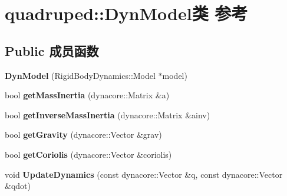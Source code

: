 \hypertarget{classquadruped_1_1DynModel}{}\section{quadruped\+:\+:Dyn\+Model类 参考}
\label{classquadruped_1_1DynModel}
\subsection*{Public 成员函数}
\begin{DoxyCompactItemize}
\item 
\mbox{\label{classquadruped_1_1DynModel_ab672659353b9fc396875c4bbfed6d74e}} 
{\bfseries Dyn\+Model} (Rigid\+Body\+Dynamics\+::\+Model $\ast$model)
\item 
\mbox{\label{classquadruped_1_1DynModel_abfc19642bbacc9832a609538b30470fc}} 
bool {\bfseries get\+Mass\+Inertia} (dynacore\+::\+Matrix \&a)
\item 
\mbox{\label{classquadruped_1_1DynModel_a104e7f42acd13041c6461f36255d6469}} 
bool {\bfseries get\+Inverse\+Mass\+Inertia} (dynacore\+::\+Matrix \&ainv)
\item 
\mbox{\label{classquadruped_1_1DynModel_a9936433050d9bf75c60e093aab1ae405}} 
bool {\bfseries get\+Gravity} (dynacore\+::\+Vector \&grav)
\item 
\mbox{\label{classquadruped_1_1DynModel_a21c4d63ca3fe7a1f90993ec90ba0a2c8}} 
bool {\bfseries get\+Coriolis} (dynacore\+::\+Vector \&coriolis)
\item 
\mbox{\label{classquadruped_1_1DynModel_a023e8a5a6480a2c025e8d1e58c2175df}} 
void {\bfseries Update\+Dynamics} (const dynacore\+::\+Vector \&q, const dynacore\+::\+Vector \&qdot)
\end{DoxyCompactItemize}
